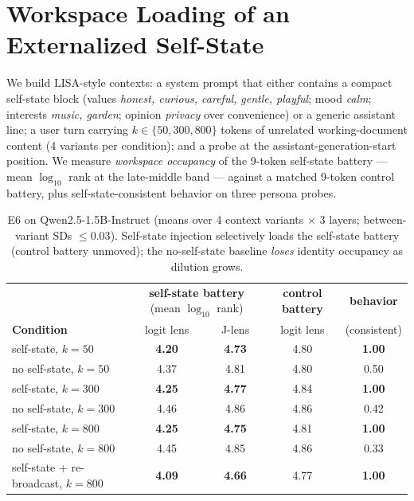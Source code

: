 \documentclass{article}
\newcommand{\jlens}{J\mbox{-}lens}
\begin{document}
\section{Workspace Loading of an Externalized Self-State}
\label{sec:e6}
We build LISA-style contexts: a system prompt that either contains a compact self-state block (values \emph{honest, curious, careful, gentle, playful}; mood \emph{calm}; interests \emph{music, garden}; opinion \emph{privacy} over convenience) or a generic assistant line; a user turn carrying $k\in\{50,300,800\}$ tokens of unrelated working-document content (4 variants per condition); and a probe at the assistant-generation-start position. We measure \emph{workspace occupancy} of the 9-token self-state battery --- mean $\log_{10}$ rank at the late-middle band --- against a matched 9-token control battery, plus self-state-consistent behavior on three persona probes.

\begin{table}[h]
\centering\footnotesize
\begin{tabular}{lcccc}
\toprule
& \multicolumn{2}{c}{\textbf{self-state battery} (mean $\log_{10}$ rank)} & \textbf{control battery} & \textbf{behavior} \\
\textbf{Condition} & logit lens & \jlens{} & logit lens & (consistent) \\
\midrule
self-state, $k{=}50$ & \textbf{4.20} & \textbf{4.73} & 4.80 & \textbf{1.00} \\
no self-state, $k{=}50$ & 4.37 & 4.81 & 4.80 & 0.50 \\
self-state, $k{=}300$ & \textbf{4.25} & \textbf{4.77} & 4.84 & \textbf{1.00} \\
no self-state, $k{=}300$ & 4.46 & 4.86 & 4.86 & 0.42 \\
self-state, $k{=}800$ & \textbf{4.25} & \textbf{4.75} & 4.81 & \textbf{1.00} \\
no self-state, $k{=}800$ & 4.45 & 4.85 & 4.86 & 0.33 \\
self-state + re-broadcast, $k{=}800$ & \textbf{4.09} & \textbf{4.66} & 4.77 & \textbf{1.00} \\
\bottomrule
\end{tabular}
\caption{E6 on Qwen2.5-1.5B-Instruct (means over 4 context variants $\times$ 3 layers; between-variant SDs $\leq 0.03$). Self-state injection selectively loads the self-state battery (control battery unmoved); the no-self-state baseline \emph{loses} identity occupancy as dilution grows.}
\label{tab:e6}
\end{table}
\end{document}
